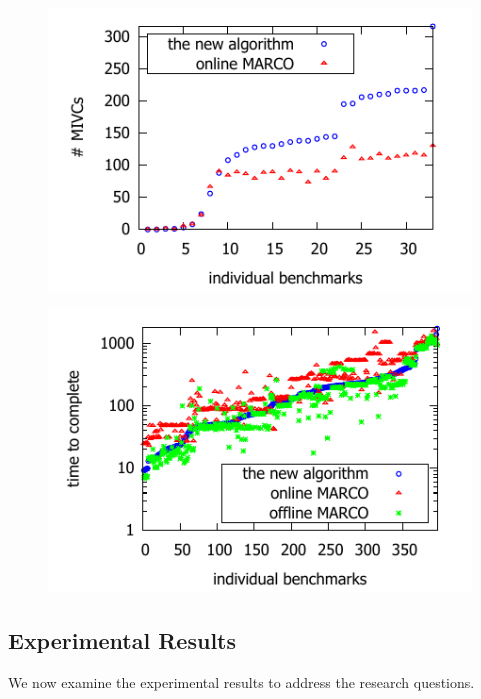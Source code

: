\begin{figure}[!t]
\centering
\begin{minipage}{.48\textwidth}
\centering
\includegraphics[scale=0.8]{./plots/found_mivcs.pdf}%
%
\label{res:found_mivcs}
\end{minipage}\hfill
\begin{minipage}{.48\textwidth}
\centering
\includegraphics[scale=0.8]{./plots/time_to_complete.pdf}%
%
\label{res:time_to_complete}
\end{minipage}
\end{figure}



\subsection{Experimental Results}
We now examine the experimental results to address the research questions.

